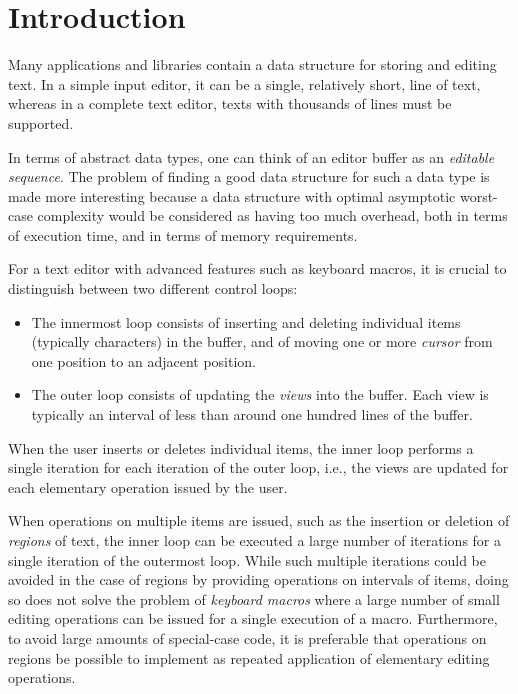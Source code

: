\section{Introduction}
\label{sec-introduction}

Many applications and libraries contain a data structure for storing
and editing text.  In a simple input editor, it can be a single,
relatively short, line of text, whereas in a complete text editor,
texts with thousands of lines must be supported.

In terms of abstract data types, one can think of an editor buffer as
an \emph{editable sequence}.  The problem of finding a good data
structure for such a data type is made more interesting because a data
structure with optimal asymptotic worst-case complexity would be
considered as having too much overhead, both in terms of execution
time, and in terms of memory requirements.

For a text editor with advanced features such as keyboard macros, it
is crucial to distinguish between two different control loops:

\begin{itemize}
\item The innermost loop consists of inserting and deleting individual
  items (typically characters) in the buffer, and of moving one or
  more \emph{cursor} from one position to an adjacent position.
\item The outer loop consists of updating the \emph{views} into the
  buffer.  Each view is typically an interval of less than around one
  hundred lines of the buffer.
\end{itemize}

When the user inserts or deletes individual items, the inner loop
performs a single iteration for each iteration of the outer loop,
i.e., the views are updated for each elementary operation issued by
the user.

When operations on multiple items are issued, such as the insertion or
deletion of \emph{regions} of text, the inner loop can be executed a
large number of iterations for a single iteration of the outermost
loop.  While such multiple iterations could be avoided in the case of
regions by providing operations on intervals of items, doing so does
not solve the problem of \emph{keyboard macros} where a large number
of small editing operations can be issued for a single execution of a
macro.  Furthermore, to avoid large amounts of special-case code, it
is preferable that operations on regions be possible to implement as
repeated application of elementary editing operations.

